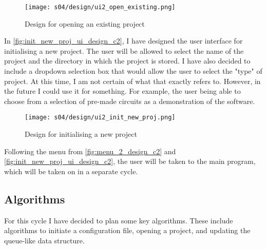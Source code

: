         \begin{figure}[!ht]
            \centering
            \texttt{[image: s04/design/ui2\_open\_existing.png]}
            \caption{Design for opening an existing project}
            \label{fig:menu_2_design_c2}
        \end{figure}

        In \autoref{fig:init_new_proj_ui_design_c2}, I have designed the user interface for initialising a new project. The user will be allowed to select the name of the project and the directory in which the project is stored. I have also decided to include a dropdown selection box that would allow the user to select the "type" of project. 
        At this time, I am not certain of what that exactly refers to. 
        However, in the future I could use it for something. 
        For example, the user being able to choose from a selection of pre-made circuits as a demonstration of the software.

        \begin{figure}[!ht]
            \centering
            \texttt{[image: s04/design/ui2\_init\_new\_proj.png]}
            \caption{Design for initialising a new project}
            \label{fig:init_new_proj_ui_design_c2}
        \end{figure}

        Following the menu from \autoref{fig:menu_2_design_c2} and \autoref{fig:init_new_proj_ui_design_c2}, the user will be taken to the main program, which will be taken on in a separate cycle.


    \subsection{Algorithms}

        For this cycle I have decided to plan some key algorithms. 
        These include algorithms to initiate a configuration file, opening a project, and updating the queue-like data structure.

